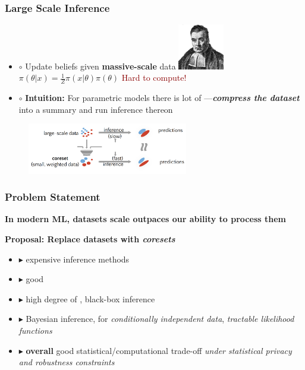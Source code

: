 \documentclass[hyperref={colorlinks = true},unknownkeysallowed]{beamer}
\begin{document}
\begin{frame}
	\frametitle{Large Scale Inference}
	\begin{itemize}
		\item  $\circ$ Update beliefs given \textbf{massive-scale} data \includegraphics[width=2cm,height=2cm]{figs/Bayes.png} \hfill $\pi(\theta|x) = \frac{1}{Z} \pi(x|\theta) \pi(\theta)$ \hfill \textcolor{darkred}{Hard to compute!}
		\item  $\circ$ \textbf{Intuition:} For parametric models there is lot of ---\textbf{\emph{compress the dataset}} into a summary and run inference thereon
	\end{itemize}
	\begin{figure}{\textwidth}
		\centering
		\includegraphics[width=7cm]{figs/coresets_high_level.png}
		\label{fig:coresets_high_level}
	\end{figure}
\end{frame}


\begin{frame}
	\frametitle{Problem Statement}
	\begin{tcolorbox}[colback=gray!5,colframe=white!40!black]  
		\centering
		\textbf{In modern ML, datasets scale outpaces our ability to process them}
	\end{tcolorbox}
	\textbf{Proposal: Replace datasets with \emph{coresets}} 
	\begin{itemize}
		\item $\blacktriangleright$  expensive inference methods
		\item $\blacktriangleright$ good 
		\item  $\blacktriangleright$ high degree of , black-box inference
		\item $\blacktriangleright$  Bayesian inference, for
	 \emph{conditionally independent data}, \emph{tractable likelihood functions} 
		\item  $\blacktriangleright$ \textbf{overall} good statistical/computational trade-off \emph{under statistical privacy and robustness constraints}
	\end{itemize}
\end{frame}
\end{document}
